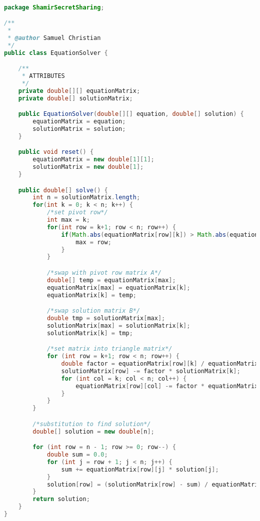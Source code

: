 \begin{lstlisting}[language=Java,basicstyle=\tiny,caption=EquationSolver.java]

package ShamirSecretSharing;

/**
 *
 * @author Samuel Christian
 */
public class EquationSolver {

    /**
     * ATTRIBUTES
     */
    private double[][] equationMatrix;
    private double[] solutionMatrix;

    public EquationSolver(double[][] equation, double[] solution) {
        equationMatrix = equation;
        solutionMatrix = solution;
    }

    public void reset() {
        equationMatrix = new double[1][1];
        solutionMatrix = new double[1];
    }

    public double[] solve() {
        int n = solutionMatrix.length;
        for(int k = 0; k < n; k++) {
            /*set pivot row*/
            int max = k;
            for(int row = k+1; row < n; row++) {
                if(Math.abs(equationMatrix[row][k]) > Math.abs(equationMatrix[max][k])) {
                    max = row;
                }
            }

            /*swap with pivot row matrix A*/
            double[] temp = equationMatrix[max];
            equationMatrix[max] = equationMatrix[k];
            equationMatrix[k] = temp;

            /*swap solution matrix B*/
            double tmp = solutionMatrix[max];
            solutionMatrix[max] = solutionMatrix[k];
            solutionMatrix[k] = tmp;

            /*set matrix into triangle matrix*/
            for (int row = k+1; row < n; row++) {
                double factor = equationMatrix[row][k] / equationMatrix[k][k];
                solutionMatrix[row] -= factor * solutionMatrix[k];
                for (int col = k; col < n; col++) {
                    equationMatrix[row][col] -= factor * equationMatrix[k][col];
                }
            }
        }

        /*substitution to find solution*/
        double[] solution = new double[n];

        for (int row = n - 1; row >= 0; row--) {
            double sum = 0.0;
            for (int j = row + 1; j < n; j++) {
                sum += equationMatrix[row][j] * solution[j];
            }
            solution[row] = (solutionMatrix[row] - sum) / equationMatrix[row][row];
        }
        return solution;
    }
}

\end{lstlisting}

